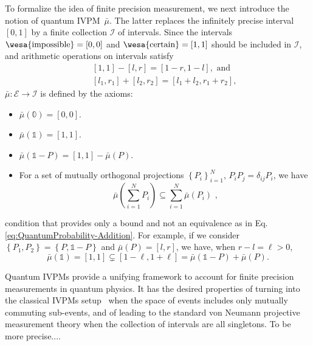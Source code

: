 \documentclass[english,reprint, aps, prl,superscriptaddress, showpacs,
showkeys, longbibliography, amsmath, amssymb]{revtex4-1}
\theoremstyle{plain}
\theoremstyle{definition}
\newcommand{\events}{\ensuremath{\mathcal{E}}}
\newcommand{\imposs}{{\text{\wesa{impossible}}}}
\newcommand{\necess}{{\text{\wesa{certain}}}}
\begin{document}
To formalize the idea of finite precision measurement, we next introduce 
the notion of quantum IVPM~$\bar{\mu}$. The latter replaces 
the infinitely precise interval $[0,1]$ by a finite collection $\mathscr{I}$ of
intervals. Since the intervals $\imposs=\left[0,0\right]$ and $\necess=\left[1,1\right]$ 
should be included in $\mathscr{I}$, and arithmetic operations on intervals satisfy
\begin{subequations}\label{eq:interval-operations}
\begin{eqnarray}
 &  & \left[1,1\right]-\left[l,r\right]=\left[1-r,1-l\right], \textrm{ and}\\
 &  & [l_{1},r_{1}]+[l_{2},r_{2}]=[l_{1}+l_{2},r_{1}+r_{2}] ,
\end{eqnarray}
\end{subequations}
$\bar{\mu}:\events\rightarrow\mathscr{I}$ is defined by the axioms:
\begin{itemize}
\item $\bar{\mu}(\mathbb{0})=\left[0,0\right]$. 
\item $\bar{\mu}(\mathbb{1})=\left[1,1\right]$. 
\item $\bar{\mu}\left(\mathbb{1}-P\right)=\left[1,1\right]-\bar{\mu}\left(P\right)$. 
\item For a set of mutually orthogonal projections $\left\{ P_{i}\right\} _{i=1}^{N}$,
$P_{i}P_{j}=\delta_{ij}P_{i}$, we have 
\begin{equation}
\bar{\mu}\left(\sum_{i=1}^{N}P_{i}\right)\subseteq\sum_{i=1}^{N}\bar{\mu}\left(P_{i}\right)\textrm{ ,}\label{eq:QuantumInterval-valuedProbability-Inclusion}
\end{equation}
\end{itemize}
condition that provides only a bound and not an equivalence as in Eq. 
\eqref{eq:QuantumProbability-Addition}. For
example, if we consider $\left\{ P_{1},P_{2}\right\} =\left\{ P,\mathbb{1}-P\right\} $
and $\bar{\mu}\left(P\right)=\left[l,r\right]$, we have, when $r-l=\ell>0$,
\[
\bar{\mu}(\mathbb{1})=\left[1,1\right]\subsetneq\left[1-\ell,1+\ell\right]=
\bar{\mu}\left(\mathbb{1}-P\right)+\bar{\mu}\left(P\right) .
\]

Quantum IVPMs provide a unifying framework to account for finite precision
measurements in quantum physics. It has the desired properties of
turning into the classical IVPMs setup~\cite{JamisonLodwick2004}
when the space of events includes only mutually commuting sub-events,
and of leading to the standard von Neumann projective measurement
theory when the collection of intervals are all singletons. To be
more precise....\newpage{}
\end{document}
